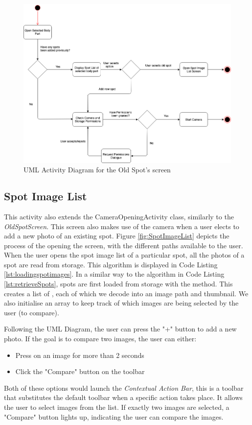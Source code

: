 \begin{figure}
    \includegraphics[width=1.2\textwidth, center]{figures/OldSpotList.png}
    \caption{UML Activity Diagram for the Old Spot's screen}
    \label{fig:OldSpotList}
\end{figure}

\subsection{Spot Image List}

This activity also extends the CameraOpeningActivity class, similarly to the \emph{OldSpotScreen}. This screen also makes use of the camera when a user elects to add a new photo of an existing spot. Figure \ref{fig:SpotImageList} depicts the process of the opening the screen, with the different paths available to the user. When the user opens the spot image list of a particular spot, all the photos of a spot are read from storage. This algorithm is displayed in Code Listing \ref{lst:loadingspotimages}. In a similar way to the algorithm in Code Listing \ref{lst:retrieveSpots}, spots are first loaded from storage with the  method. This creates a list of , each of which we decode into an image path and thumbnail. We also initialise an array  to keep track of which images are being selected by the user (to compare).

Following the UML Diagram, the user can press the "+" button to add a new photo. If the goal is to compare two images, the user can either:
\begin{itemize}
    \item Press on an image for more than 2 seconds
    \item Click the "Compare" button on the toolbar
\end{itemize}
Both of these options would launch the \emph{Contextual Action Bar}, this is a toolbar that substitutes the default toolbar when a specific action takes place. It allows the user to select images from the list. If exactly two images are selected, a "Compare" button lights up, indicating the user can compare the images.

